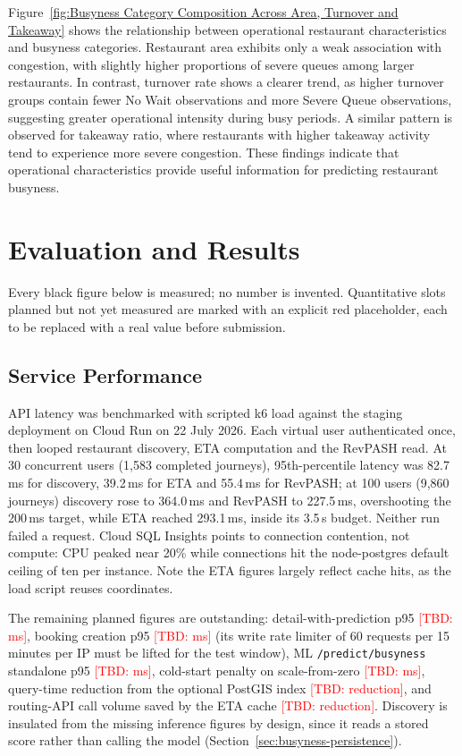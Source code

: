 \documentclass[conference]{IEEEtran}
\newcommand{\tbd}[1]{\textcolor{red}{[TBD: #1]}}
\begin{document}
Figure~\ref{fig:Busyness Category Composition Across Area, Turnover and Takeaway} shows the relationship between operational restaurant characteristics and busyness categories. Restaurant area exhibits only a weak association with congestion, with slightly higher proportions of severe queues among larger restaurants. In contrast, turnover rate shows a clearer trend, as higher turnover groups contain fewer No Wait observations and more Severe Queue observations, suggesting greater operational intensity during busy periods. A similar pattern is observed for takeaway ratio, where restaurants with higher takeaway activity tend to experience more severe congestion. These findings indicate that operational characteristics provide useful information for predicting restaurant busyness.

\section{Evaluation and Results}

Every black figure below is measured; no number is invented. Quantitative slots planned but not yet measured are marked with an explicit red placeholder, each to be replaced with a real value before submission.

\subsection{Service Performance}
\label{sec:service-performance}

API latency was benchmarked with scripted k6 load against the staging
deployment on Cloud Run on 22 July 2026. Each virtual user authenticated
once, then looped restaurant discovery, ETA computation and the RevPASH
read. At 30 concurrent users (1{,}583 completed journeys), 95th-percentile
latency was 82.7\,ms for discovery, 39.2\,ms for ETA and 55.4\,ms for
RevPASH; at 100 users (9{,}860 journeys) discovery rose to 364.0\,ms and
RevPASH to 227.5\,ms, overshooting the 200\,ms target, while ETA reached
293.1\,ms, inside its 3.5\,s budget. Neither run failed a request. Cloud
SQL Insights points to connection contention, not compute: CPU peaked near
20\% while connections hit the node-postgres default ceiling of ten per
instance. Note the ETA figures largely reflect cache hits, as the load
script reuses coordinates.

The remaining planned figures are outstanding: detail-with-prediction p95
\tbd{ms}, booking creation p95 \tbd{ms} (its write rate limiter of 60
requests per 15 minutes per IP must be lifted for the test window), ML
\texttt{/predict/busyness} standalone p95 \tbd{ms}, cold-start penalty on
scale-from-zero \tbd{ms}, query-time reduction from the optional PostGIS
index \tbd{reduction}, and routing-API call volume saved by the ETA cache
\tbd{reduction}. Discovery is insulated from the missing inference figures
by design, since it reads a stored score rather than calling the model
(Section~\ref{sec:busyness-persistence}).
\end{document}
